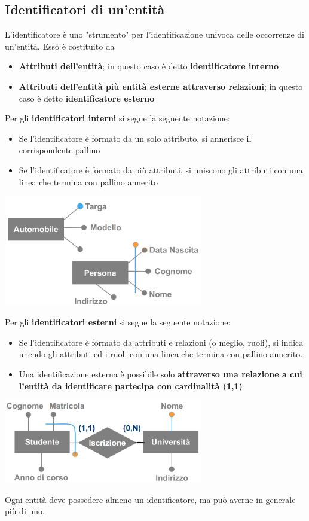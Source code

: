 \documentclass[12pt]{article}
\begin{document}
\subsection{Identificatori di un'entità}
L'identificatore è uno "strumento" per l'identificazione univoca delle occorrenze di un'entità.
Esso è costituito da
\begin{itemize}
    \item \textbf{Attributi dell'entità}; in questo caso è detto \textbf{identificatore interno}
    \item \textbf{Attributi dell'entità più entità esterne attraverso relazioni}; in questo caso è detto \textbf{identificatore esterno}
\end{itemize}
Per gli \textbf{identificatori interni} si segue la seguente notazione:
\begin{itemize}
    \item Se l'identificatore è formato da un solo attributo, si annerisce il corrispondente pallino
    \item Se l'identificatore è formato da più attributi, si uniscono gli attributi con una linea che termina con pallino annerito
\end{itemize}
\begin{center}
    \includegraphics[width = 0.65\textwidth]{Images/34.PNG}
\end{center}
Per gli \textbf{identificatori esterni} si segue la seguente notazione:
\begin{itemize}
    \item Se l'identificatore è formato da attributi e relazioni (o meglio, ruoli), si indica unendo gli attributi ed i ruoli con una linea che termina con pallino annerito.
    \item Una identificazione esterna è possibile solo \textbf{attraverso una relazione a cui l'entità da identificare partecipa con cardinalità (1,1)}
\end{itemize}
\begin{center}
    \includegraphics[width = 0.65\textwidth]{Images/35.PNG}
\end{center}
Ogni entità deve possedere almeno un identificatore, ma può averne in generale più di uno.
\end{document}
